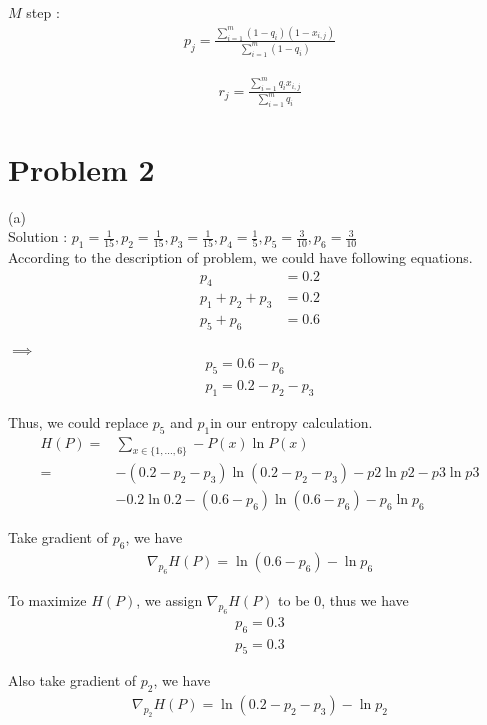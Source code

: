 \documentclass[twoside,11pt]{homework}
\begin{document}
${M}$  step :
\begin{align*}
p_j = \frac  {\sum _ {i = 1} ^ {m} (1 - q_i)(1 - x_{i, j})} {\sum _ {i = 1} ^ {m} (1 - q_i)}
\end{align*}

\begin{align*}
r_j =  \frac {\sum _ {i = 1} ^ {m} q_i x _ {i, j} } {\sum _ {i = 1} ^ {m} q_i }
\end{align*}



\section*{Problem 2}
\indent
(a) \\ \indent
Solution : $p_1 =  \frac {1}{15}, p_2 = \frac {1}{15}, p_3 = \frac {1}{15}, p_4 = \frac{1}{5} , p_5 = \frac{3}{10}, p_6 =  \frac{3}{10}$ \\

According to the description of problem, we could have following equations. 
\begin{align*}
p_4 &= 0.2 \\
p_1 + p_2 + p_3  &= 0.2 \\
p_5 + p_6 &= 0.6
\end{align*}

$\implies$
\begin{align*}
p_5 = 0.6 - p_6 \\
p_1 = 0.2 - p_2 - p_3
\end{align*}

Thus, we could replace $p_5$ and $p_1$in our entropy calculation. 
\begin{align*}
H(P) =& \sum _{x \in \{1, ..., 6\}} - P(x) \ln P(x) \\
 = & - (0.2 - p_2 - p_3) \ln (0.2 - p_2 - p_3)  - p2\ln p2 - p3 \ln p3  \\
& - 0.2 \ln 0.2 - (0.6 - p_6) \ln (0.6 - p_6) - p_6 \ln p_6
\end{align*}

Take gradient of $p_6$, we have 
\begin{align*}
\nabla_{p_6}H(P) = \ln(0.6 - p_6) - \ln p_6
\end{align*}

To maximize $H(P)$, we assign $\nabla_{p_6}H(P)$ to be 0, thus we have 
\begin{align*}
p_6 = 0.3 \\
p_5 = 0.3
\end{align*}

Also take gradient of $p_2$, we have 
\begin{align*}
\nabla_{p_2}H(P) = \ln(0.2 - p_2 - p_3) - \ln p_2
\end{align*}
\end{document}
